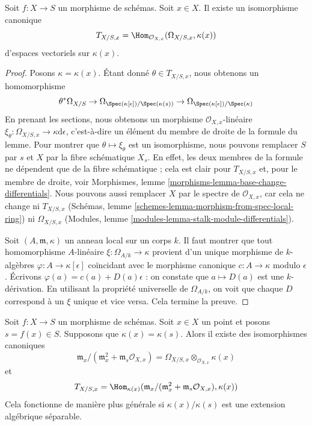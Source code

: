 \begin{lemma}
\label{lemma-tangent-space-cotangent-space}
Soit $f : X \to S$ un morphisme de
schémas. Soit $x \in X$. Il existe un isomorphisme canonique
$$
T_{X/S, x} = \Hom_{\mathcal{O}_{X, x}}(\Omega_{X/S, x}, \kappa(x))
$$
d'espaces vectoriels sur $\kappa(x)$.
\end{lemma}

\begin{proof}
Posons $\kappa = \kappa(x)$. Étant donné
$\theta \in T_{X/S, x}$, nous obtenons un homomorphisme
$$
\theta^*\Omega_{X/S} \to
\Omega_{\Spec(\kappa[\epsilon])/\Spec(\kappa(s))} \to
\Omega_{\Spec(\kappa[\epsilon])/\Spec(\kappa)}
$$
En prenant les sections, nous obtenons un morphisme
$\mathcal{O}_{X, x}$-linéaire $\xi_\theta : \Omega_{X/S, x}
\to \kappa \text{d}\epsilon$, c'est-à-dire un élément du
membre de droite de la formule du lemme. Pour montrer que
$\theta \mapsto \xi_\theta$ est un isomorphisme, nous
pouvons remplacer $S$ par $s$ et $X$ par la fibre schématique
$X_s$. En effet, les deux membres de la formule ne dépendent
que de la fibre schématique ; cela est clair pour $T_{X/S,
x}$ et, pour le membre de droite, voir Morphismes, lemme
\ref{morphisms-lemma-base-change-differentials}. Nous pouvons
aussi remplacer $X$ par le spectre de $\mathcal{O}_{X, x}$,
car cela ne change ni $T_{X/S, x}$ (Schémas, lemme
\ref{schemes-lemma-morphism-from-spec-local-ring}) ni $\Omega_{X/S,
x}$ (Modules, lemme \ref{modules-lemma-stalk-module-differentials}).

\medskip\noindent
Soit $(A, \mathfrak m, \kappa)$ un anneau local sur un
corps $k$. Il faut montrer que tout
homomorphisme $A$-linéaire $\xi : \Omega_{A/k} \to \kappa$ provient
d'un unique morphisme de $k$-algèbres $\varphi : A \to
\kappa[\epsilon]$ coïncidant avec le morphisme canonique $c : A \to
\kappa$ modulo $\epsilon$. Écrivons $\varphi(a) = c(a) + D(a) \epsilon$
: on constate que $a \mapsto D(a)$ est une $k$-dérivation. En
utilisant la propriété universelle de $\Omega_{A/k}$, on voit que
chaque $D$ correspond à un $\xi$ unique et vice versa. Cela termine la preuve.
\end{proof}

\begin{lemma}
\label{lemma-tangent-space-rational-point}
Soit $f : X \to S$ un morphisme de schémas. Soit
$x \in X$ un point et posons $s = f(x) \in S$. Supposons que
$\kappa(x) = \kappa(s)$. Alors il existe des isomorphismes canoniques
$$
\mathfrak m_x/(\mathfrak m_x^2 + \mathfrak m_s\mathcal{O}_{X, x})
=
\Omega_{X/S, x} \otimes_{\mathcal{O}_{X, x}} \kappa(x)
$$
et
$$
T_{X/S, x} =
\Hom_{\kappa(x)}(
\mathfrak m_x/(\mathfrak m_x^2 + \mathfrak m_s\mathcal{O}_{X, x}),
\kappa(x))
$$
Cela fonctionne de manière plus générale si
$\kappa(x)/\kappa(s)$ est une extension algébrique séparable.
\end{lemma}

